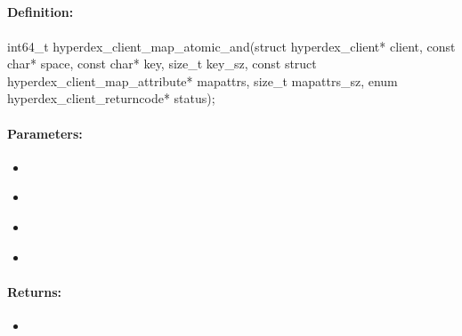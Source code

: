 \pagebreak
\subsection{}
\label{api:c:map_atomic_and}


\paragraph{Definition:}
\begin{ccode}
int64_t hyperdex_client_map_atomic_and(struct hyperdex_client* client,
        const char* space,
        const char* key, size_t key_sz,
        const struct hyperdex_client_map_attribute* mapattrs, size_t mapattrs_sz,
        enum hyperdex_client_returncode* status);
\end{ccode}

\paragraph{Parameters:}
\begin{itemize}[noitemsep]
\item {}\\

\item {}\\

\item {}\\

\item {}\\

\end{itemize}

\paragraph{Returns:}
\begin{itemize}[noitemsep]
\item {}\\

\end{itemize}

